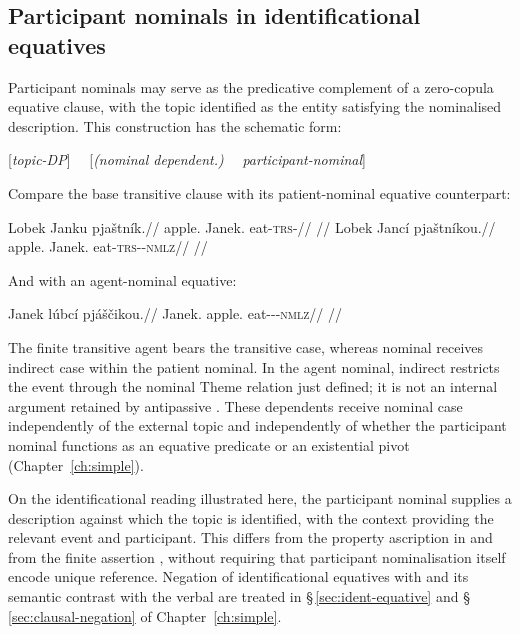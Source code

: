 \subsection{Participant nominals in identificational equatives}
\label{sec:nmlz-predicative}

Participant nominals may serve as the predicative complement of a zero-copula
equative clause, with the topic  identified as the entity satisfying
the nominalised description. This construction has the schematic form:

\begin{center}
[\textit{topic-DP}] \ \ [\textit{(nominal dependent.\Ind{})} \ \ \textit{participant-nominal}]
\end{center}

\noindent Compare the base transitive clause with its patient-nominal equative counterpart:

\pex
\a
\begingl
\gla Lobek Janku pjaštník.//
\glb apple.\Dir{} Janek.\Trs{} eat-\textsc{trs}-\Pf{}//
\glft {} //
\endgl
\a
\begingl
\gla Lobek Jancí pjaštníkou.//
\glb apple.\Dir{} Janek.\Ind{} eat-\textsc{trs}-\Pf{}-\textsc{nmlz}//
\glft {} //
\endgl
\xe

\noindent And with an agent-nominal equative:

\ex
\begingl
\gla Janek lúbcí pjáščikou.//
\glb Janek.\Dir{} apple.\Ind{} eat-\Antip{}-\Pf{}-\textsc{nmlz}//
\glft {} //
\endgl
\xe

The finite transitive agent  bears the transitive case,
whereas nominal  receives indirect case within the patient
nominal. In the agent nominal, indirect  restricts the event
through the nominal Theme relation just defined; it is not an internal
argument retained by antipassive . These dependents receive
nominal case independently of the external topic and independently of whether
the participant nominal functions as an equative predicate or an existential
pivot (Chapter~\ref{ch:simple}).

On the identificational reading illustrated here, the participant nominal
supplies a description against which the topic is identified, with the context
providing the relevant event and participant. This differs from the property
ascription in   and from the finite
assertion  , without
requiring that participant nominalisation itself encode unique reference.
Negation of identificational equatives
with  and its semantic contrast with the verbal  are treated
in §\,\ref{sec:ident-equative} and §\,\ref{sec:clausal-negation} of
Chapter~\ref{ch:simple}.


